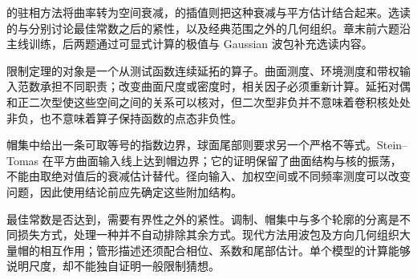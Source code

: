 \ProseParagraphBreak

的驻相方法将曲率转为空间衰减，的插值则把这种衰减与平方估计结合起来。选读的与分别讨论最佳常数之后的紧性，以及经典范围之外的几何组织。章末前六题沿主线训练，后两题通过可显式计算的极值与 Gaussian 波包补充选读内容。








\begin{chaptersummary}
限制定理的对象是一个从测试函数连续延拓的算子。曲面测度、环境测度和带权输入范数承担不同职责；改变曲面尺度或密度时，相关因子必须重新计算。延拓对偶和正二次型使这些空间之间的关系可以核对，但二次型非负并不意味着卷积核处处非负，也不意味着算子保持函数的点态非负性。

\ProseParagraphBreak

帽集中给出一条可取等号的指数边界，球面尾部则要求另一个严格不等式。Stein--Tomas 在平方曲面输入线上达到帽边界；它的证明保留了曲面结构与核的振荡，不能由取绝对值后的衰减估计替代。径向输入、加权空间或不同频率测度可以改变问题，因此使用结论前应先确定这些附加结构。

\ProseParagraphBreak

最佳常数是否达到，需要有界性之外的紧性。调制、帽集中与多个轮廓的分离是不同损失方式，处理一种并不自动排除其余方式。现代方法用波包及方向几何组织大量帽的相互作用；管形描述还须配合相位、系数和尾部估计。单个模型的计算能够说明尺度，却不能独自证明一般限制猜想。
\end{chaptersummary}

\BookExercises

